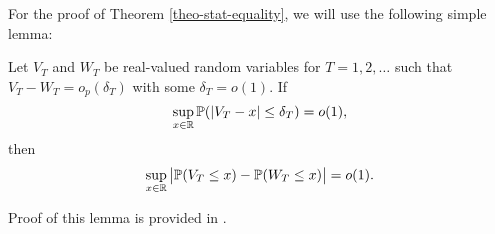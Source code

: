 \documentclass[a4paper,12pt]{article}
\begin{document}
For the proof of Theorem \ref{theo-stat-equality}, we will use the following simple lemma: 
\begin{lemmaA}\label{lemma1-theo-stat}
Let $V_T$ and $W_T$ be real-valued random variables for $T = 1,2,\ldots$ such that $V_T - W_T = o_p(\delta_T)$ with some $\delta_T = o(1)$. If 
\begin{equation}\label{eq-lemma1-cond}
\sup_{x \in \mathbb{R}} \mathbb{P}(|V_T - x| \le \delta_T) = o(1), 
\end{equation}
then 
\begin{equation}\label{eq-lemma1-statement}
\sup_{x \in \mathbb{R}} \big| \mathbb{P}(V_T \le x) - \mathbb{P}(W_T \le x) \big| = o(1). 
\end{equation}
\end{lemmaA}
Proof of this lemma is provided in \cite*{KhismatullinaVogt2018}.
\end{document}
